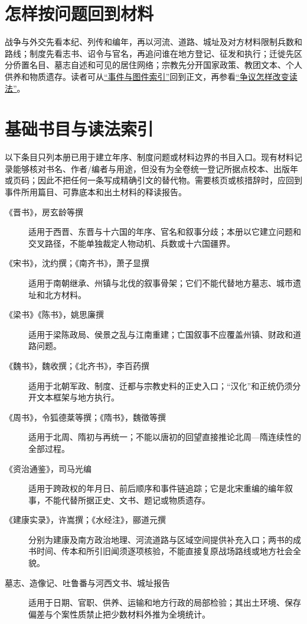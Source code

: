 \section{怎样按问题回到材料}
\label{src:question-method}

战争与外交先看本纪、列传和编年，再以河流、道路、城址及对方材料限制兵数和路线；制度先看志书、诏令与官名，再追问谁在地方登记、征发和执行；迁徙先区分侨置名目、墓志自述和可见的居住网络；宗教先分开国家政策、教团文本、个人供养和物质遗存。读者可从\hyperref[app:index]{“事件与图件索引”}回到正文，再参看\hyperref[app:controversies]{“争议怎样改变读法”}。

\section{基础书目与读法索引}

以下条目只列本册已用于建立年序、制度问题或材料边界的书目入口。现有材料记录能够核对书名、作者/编者与用途，但没有为全卷统一登记所据点校本、出版年或页码；因此不把任何一条写成精确引文的替代物。需要核页或核措辞时，应回到事件所用篇目、可靠底本和出土材料的释读报告。

\begin{description}
  \item[《晋书》，房玄龄等撰] 适用于西晋、东晋与十六国的年序、官名和叙事分歧；本册以它建立问题和交叉路径，不能单独裁定人物动机、兵数或十六国疆界。
  \item[《宋书》，沈约撰；《南齐书》，萧子显撰] 适用于南朝继承、州镇与北伐的叙事骨架；它们不能代替地方墓志、城市遗址和北方材料。
  \item[《梁书》《陈书》，姚思廉撰] 适用于梁陈政局、侯景之乱与江南重建；亡国叙事不应覆盖州镇、财政和道路问题。
  \item[《魏书》，魏收撰；《北齐书》，李百药撰] 适用于北朝军政、制度、迁都与宗教史料的正史入口；“汉化”和正统仍须分开文本框架与地方执行。
  \item[《周书》，令狐德棻等撰；《隋书》，魏徵等撰] 适用于北周、隋初与再统一；不能以唐初的回望直接推论北周—隋连续性的全部过程。
  \item[《资治通鉴》，司马光编] 适用于跨政权的年月日、前后顺序和事件链追踪；它是北宋重编的编年叙事，不能代替所据正史、文书、题记或物质遗存。
  \item[《建康实录》，许嵩撰；《水经注》，郦道元撰] 分别为建康及南方政治地理、河流道路与区域空间提供补充入口；两书的成书时间、传本和所引旧闻须逐项核验，不能直接复原战场路线或地方社会全貌。
  \item[墓志、造像记、吐鲁番与河西文书、城址报告] 适用于日期、官职、供养、运输和地方行政的局部检验；其出土环境、保存偏差与个案性质禁止把少数材料外推为全境统计。
\end{description}
